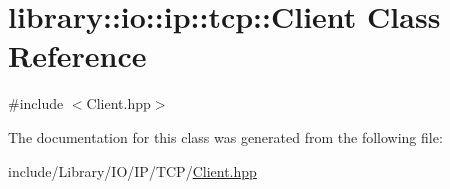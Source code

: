 \hypertarget{classlibrary_1_1io_1_1ip_1_1tcp_1_1_client}{}\section{library\+:\+:io\+:\+:ip\+:\+:tcp\+:\+:Client Class Reference}
\label{classlibrary_1_1io_1_1ip_1_1tcp_1_1_client}


{\ttfamily \#include $<$Client.\+hpp$>$}



The documentation for this class was generated from the following file\+:\begin{DoxyCompactItemize}
\item 
include/\+Library/\+I\+O/\+I\+P/\+T\+C\+P/\hyperlink{_client_8hpp}{Client.\+hpp}\end{DoxyCompactItemize}
